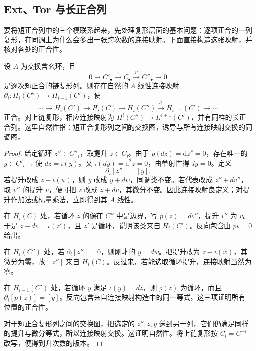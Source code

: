 \subsection{Ext、Tor 与长正合列}
\label{g5:subsec:0801:03}

要将短正合列中的三个模联系起来，先处理复形层面的基本问题：逐项正合的一列复形，在同调上为什么会多出一张跨次数的连接映射。下面直接构造这张映射，并核对各处的正合性。

\begin{proposition}\label{g5:prop:complex-long-exact}
	设 \(A\) 为交换含幺环，且
	\[
		0\longrightarrow C'_\bullet\xrightarrow{\iota}C_\bullet
		\xrightarrow{p}C''_\bullet\longrightarrow0
	\]
	是逐次短正合的链复形列。则存在自然的 \(A\) 线性连接映射
	\(\partial_i:H_i(C'')\to H_{i-1}(C')\)，使
	\[
		\cdots\longrightarrow H_i(C')\longrightarrow H_i(C)
		\longrightarrow H_i(C'')\xrightarrow{\partial_i}
		H_{i-1}(C')\longrightarrow\cdots
	\]
	正合。对上链复形，相应连接映射为
	\(H^i(C'')\to H^{i+1}(C')\)，并有同样的长正合列。这里自然性指：短正合复形列之间的交换图，诱导与所有连接映射交换的同调图。
\end{proposition}
\begin{proof}
	给定循环 \(z''\in C''_i\)，取提升 \(z\in C_i\)。由于 \(p(dz)=\mathrm{d} z''=0\)，存在唯一的 \(y\in C'_{i-1}\) 使 \(dz=\iota(y)\)。又 \(\iota(dy)=\mathrm{d}^2z=0\)，由单射性得 \(dy=0\)。定义
	\[
		\partial_i[z'']=[y].
	\]
	若提升改成 \(z+\iota(w)\)，则 \(y\) 改成 \(y+dw\)，同调类不变。若代表改成 \(z''+dv''\)，取 \(v''\) 的提升 \(v\)，便可把 \(z\) 改成 \(z+dv\)，其微分不变。因此连接映射良定义；对提升作加法或标量乘法，立即得到其 \(A\) 线性。

	在 \(H_i(C)\) 处，若循环 \(z\) 的像在 \(C''\) 中是边界，写 \(p(z)=dv''\)，提升 \(v''\) 为 \(v\)。于是 \(z-dv=\iota(z')\)，且 \(z'\) 是循环，说明该类来自 \(H_i(C')\)。反向包含由 \(p\iota=0\) 给出。

	在 \(H_i(C'')\) 处，若 \(\partial_i[z'']=0\)，则刚才的 \(y=dw\)。把提升改为 \(z-\iota(w)\)，其微分为零，故 \([z'']\) 来自 \(H_i(C)\)。反过来，若能选取循环提升，连接映射当然为零。

	在 \(H_{i-1}(C')\) 处，若循环 \(y\) 满足 \(\iota(y)=dz\)，则 \(p(z)\) 为循环，而且 \(\partial_i[p(z)]=[y]\)。反向包含来自连接映射构造中的同一等式。这三项证明所有位置的正合性。

	对于短正合复形列之间的交换图，把选定的 \(z'',z,y\) 送到另一列，它们仍满足同样的提升与微分等式，所以连接映射交换。这证明自然性。将上链复形按 \(C_i=C^{-i}\) 改写，便得到升次数的版本。
\end{proof}

